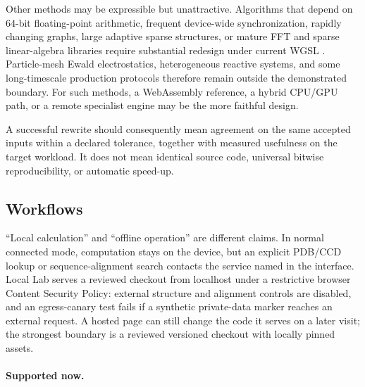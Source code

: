 Other methods may be expressible but unattractive. Algorithms that depend on
64-bit floating-point arithmetic, frequent device-wide synchronization, rapidly
changing graphs, large adaptive sparse structures, or mature FFT and sparse
linear-algebra libraries require substantial redesign under current WGSL
\cite{w3c2026wgsl}. Particle-mesh Ewald electrostatics, heterogeneous reactive
systems, and some long-timescale production protocols therefore remain outside
the demonstrated boundary. For such methods, a WebAssembly reference, a hybrid
CPU/GPU path, or a remote specialist engine may be the more faithful design.

A successful rewrite should consequently mean agreement on the same accepted
inputs within a declared tolerance, together with measured usefulness on the
target workload. It does not mean identical source code, universal bitwise
reproducibility, or automatic speed-up.

\subsection{Workflows}
\label{app:workflows}

``Local calculation'' and ``offline operation'' are different claims. In normal
connected mode, computation stays on the device, but an explicit PDB/CCD lookup
or sequence-alignment search contacts the service named in the interface. Local
Lab serves a reviewed checkout from localhost under a restrictive browser
Content Security Policy: external structure and alignment controls are disabled,
and an egress-canary test fails if a synthetic private-data marker reaches an
external request. A hosted page can still change the code it serves on a later
visit; the strongest boundary is a reviewed versioned checkout with locally
pinned assets.

\paragraph{Supported now.}

